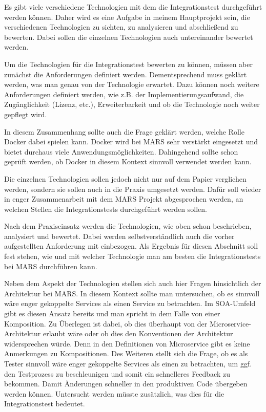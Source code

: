 \documentclass{llncs}
\begin{document}
Es gibt viele verschiedene Technologien mit dem die Integrationstest durchgeführt werden können. Daher wird es eine Aufgabe in meinem Hauptprojekt sein, die verschiedenen Technologien zu sichten, zu analysieren und abschließend zu bewerten. Dabei sollen die einzelnen Technologien auch untereinander bewertet werden.

Um die Technologien für die Integrationstest bewerten zu können, müssen aber zunächst die Anforderungen definiert werden. Dementsprechend muss geklärt werden, was man genau von der Technologie erwartet. Dazu können noch weitere Anforderungen definiert werden, wie z.B. der Implementierungsaufwand, die Zugänglichkeit (Lizenz, etc.), Erweiterbarkeit und ob die Technologie noch weiter gepflegt wird.

In diesem Zusammenhang sollte auch die Frage geklärt werden, welche Rolle Docker dabei spielen kann. Docker wird bei MARS sehr verstärkt eingesetzt und bietet durchaus viele Anwendungsmöglichkeiten. Dahingehend sollte schon geprüft werden, ob Docker in diesem Kontext sinnvoll verwendet werden kann.

Die einzelnen Technologien sollen jedoch nicht nur auf dem Papier verglichen werden, sondern sie sollen auch in die Praxis umgesetzt werden. Dafür soll wieder in enger Zusammenarbeit mit dem MARS Projekt abgesprochen werden, an welchen Stellen die Integrationstests durchgeführt werden sollen.

Nach dem Praxiseinsatz werden die Technologien, wie oben schon beschrieben, analysiert und bewertet. Dabei werden selbstverständlich auch die vorher aufgestellten Anforderung mit einbezogen. Als Ergebnis für diesen Abschnitt soll fest stehen, wie und mit welcher Technologie man am besten die Integrationstests bei MARS durchführen kann.

Neben dem Aspekt der Technologien stellen sich auch hier Fragen hinsichtlich der Architektur bei MARS. In diesem Kontext sollte man untersuchen, ob es sinnvoll wäre enger gekoppelte Services als einen Service zu betrachten. Im SOA-Umfeld gibt es diesen Ansatz bereits und man spricht in dem Falle von einer Komposition. Zu Überlegen ist dabei, ob dies überhaupt von der Microservice-Architektur erlaubt wäre oder ob dies den Konventionen der Architektur widersprechen würde. Denn in den Definitionen von Microservice gibt es keine Anmerkungen zu Kompositionen. Des Weiteren stellt sich die Frage, ob es als Tester sinnvoll wäre enger gekoppelte Services als einen zu betrachten, um ggf. den Testprozess zu beschleunigen und somit ein schnelleres Feedback zu bekommen. Damit Änderungen schneller in den produktiven Code übergeben werden können. Untersucht werden müsste zusätzlich, was dies für die Integrationstest bedeutet. 
\end{document}

